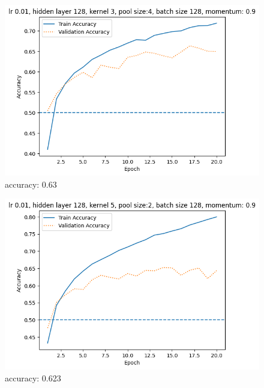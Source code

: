 \begin{figure}[!ht]
    \centering\includegraphics[width=1\linewidth]{A5b-1.png}
    \caption{accuracy: 0.63}
\end{figure}
\begin{figure}[!t]
    \centering\includegraphics[width=1\linewidth]{A5b-2.png}
    \caption{accuracy: 0.623}
\end{figure}

\newpage
\inputminted{python3}{../hw4-A/image_classification.py}